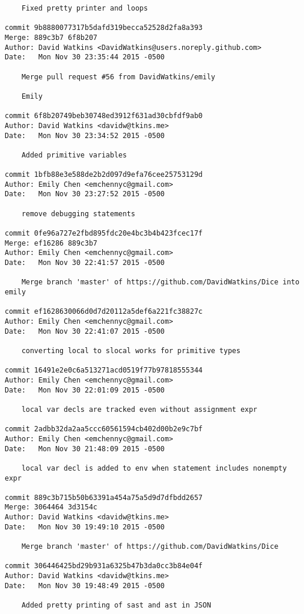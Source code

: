 \begin{verbatim}
    Fixed pretty printer and loops

commit 9b8880077317b5dafd319becca52528d2fa8a393
Merge: 889c3b7 6f8b207
Author: David Watkins <DavidWatkins@users.noreply.github.com>
Date:   Mon Nov 30 23:35:44 2015 -0500

    Merge pull request #56 from DavidWatkins/emily
    
    Emily

commit 6f8b20749beb30748ed3912f631ad30cbfdf9ab0
Author: David Watkins <davidw@tkins.me>
Date:   Mon Nov 30 23:34:52 2015 -0500

    Added primitive variables

commit 1bfb88e3e588de2b2d097d9efa76cee25753129d
Author: Emily Chen <emchennyc@gmail.com>
Date:   Mon Nov 30 23:27:52 2015 -0500

    remove debugging statements

commit 0fe96a727e2fbd895fdc20e4bc3b4b423fcec17f
Merge: ef16286 889c3b7
Author: Emily Chen <emchennyc@gmail.com>
Date:   Mon Nov 30 22:41:57 2015 -0500

    Merge branch 'master' of https://github.com/DavidWatkins/Dice into emily

commit ef1628630066d0d7d20112a5def6a221fc38827c
Author: Emily Chen <emchennyc@gmail.com>
Date:   Mon Nov 30 22:41:07 2015 -0500

    converting local to slocal works for primitive types

commit 16491e2e0c6a513271acd0519f77b97818555344
Author: Emily Chen <emchennyc@gmail.com>
Date:   Mon Nov 30 22:01:09 2015 -0500

    local var decls are tracked even without assignment expr

commit 2adbb32da2aa5ccc60561594cb402d00b2e9c7bf
Author: Emily Chen <emchennyc@gmail.com>
Date:   Mon Nov 30 21:48:09 2015 -0500

    local var decl is added to env when statement includes nonempty expr

commit 889c3b715b50b63391a454a75a5d9d7dfbdd2657
Merge: 3064464 3d3154c
Author: David Watkins <davidw@tkins.me>
Date:   Mon Nov 30 19:49:10 2015 -0500

    Merge branch 'master' of https://github.com/DavidWatkins/Dice

commit 306446425bd29b931a6325b47b3da0cc3b84e04f
Author: David Watkins <davidw@tkins.me>
Date:   Mon Nov 30 19:48:49 2015 -0500

    Added pretty printing of sast and ast in JSON


\end{verbatim}
